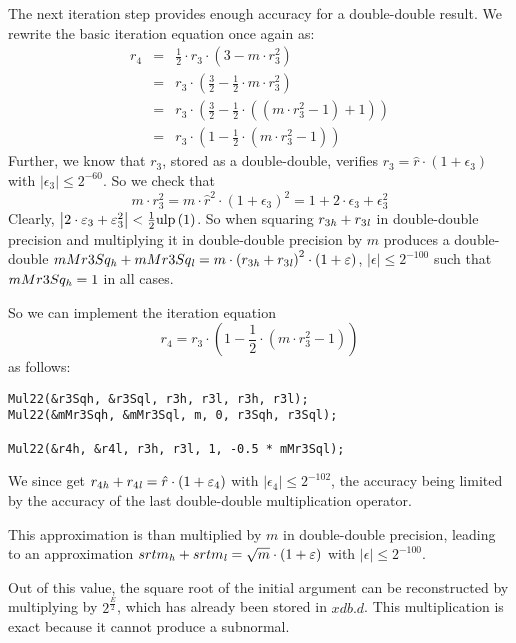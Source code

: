 The next iteration step provides enough accuracy for a double-double result.
We rewrite the basic iteration equation once again as:
\begin{eqnarray*}
r_4 & = & \frac{1}{2} \cdot r_3 \cdot \left( 3 - m \cdot r_3^2 \right) \\
& = & r_3 \cdot \left( \frac{3}{2} - \frac{1}{2} \cdot m \cdot r_3^2 \right) \\
& = & r_3 \cdot \left( \frac{3}{2} - \frac{1}{2} \cdot \left( \left( m \cdot r_3^2 - 1 \right) + 1 \right) \right) \\
& = & r_3 \cdot \left( 1 - \frac{1}{2} \cdot \left( m \cdot r_3^2 - 1 \right) \right)
\end{eqnarray*}
Further, we know that $r_3$, stored as a double-double, verifies $r_3
= \hat{r} \cdot \left( 1 + \epsilon_3 \right)$ with $\left \vert
\epsilon_3 \right \vert \leq 2^{-60}$. So we check that
$$m \cdot r_3^2 = m \cdot \hat{r}^2 \cdot \left( 1 +
\epsilon_3 \right)^2 = 1 + 2 \cdot \epsilon_3 + \epsilon_3^2$$
Clearly, $\left \vert 2 \cdot \varepsilon_3 + \varepsilon_3^2 \right \vert <
\frac{1}{2} \mathrm{ulp}\left( 1 \right)$. So when squaring $r_{3\mathit{h}} + r_{3\mathit{l}}$ in double-double precision
and multiplying it in double-double precision by $m$ produces a
double-double $mMr3Sq_{\mathit{h}} + mMr3Sq_{\mathit{l}} = m \cdot \left( r_{3\mathit{h}} +
r_{3\mathit{l}} \right)^2 \cdot \left( 1 + \varepsilon \right)$, $\left \vert
\epsilon \right \vert \leq 2^{-100}$ such that $mMr3Sq_{\mathit{h}} = 1$ in all
cases.

So we can implement the iteration equation
$$r_4 = r_3 \cdot \left( 1 - \frac{1}{2} \cdot \left( m \cdot r_3^2 - 1 \right) \right)$$
as follows:
\begin{lstlisting}[caption={Newton iteration - second double-double step},firstnumber=1]
Mul22(&r3Sqh, &r3Sql, r3h, r3l, r3h, r3l);
Mul22(&mMr3Sqh, &mMr3Sql, m, 0, r3Sqh, r3Sql);

Mul22(&r4h, &r4l, r3h, r3l, 1, -0.5 * mMr3Sql);
\end{lstlisting}
We since get $r_{4\mathit{h}} + r_{4\mathit{l}} = \hat{r} \cdot \left( 1 +
\varepsilon_4 \right)$ with $\left \vert \epsilon_4 \right \vert \leq
2^{-102}$, the accuracy being limited by the accuracy of the last
double-double multiplication operator.

This approximation is than multiplied by $m$ in double-double
precision, leading to an approximation $srtm_{\mathit{h}} + srtm_{\mathit{l}} = \sqrt{m}
\cdot \left( 1 + \varepsilon \right)$ with $\left \vert \epsilon \right \vert \leq
2^{-100}$.

Out of this value, the square root of the initial argument can be
reconstructed by multiplying by $2^{\frac{E}{2}}$, which has already
been stored in $xdb.d$. This multiplication is exact because it cannot
produce a subnormal.

